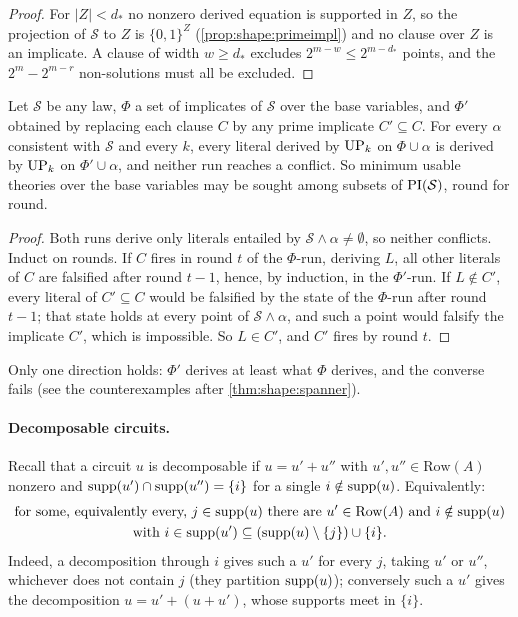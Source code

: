\begin{proof}
For $\lvert Z\rvert<d_*$ no nonzero derived equation is supported in $Z$, so the projection of $\mathcal S$ to $Z$ is $\{0,1\}^Z$ (\cref{prop:shape:primeimpl}) and no clause over $Z$ is an implicate. A clause of width $w\ge d_*$ excludes $2^{m-w}\le2^{m-d_*}$ points, and the $2^m-2^{m-r}$ non-solutions must all be excluded.
\end{proof}

\begin{lemma}[Subsumption]\label{lem:shape:subsumption}
Let $\mathcal S$ be any law, $\Phi$ a set of implicates of $\mathcal S$ over the base variables, and $\Phi'$ obtained by replacing each clause $C$ by any prime implicate $C'\subseteq C$. For every $\alpha$ consistent with $\mathcal S$ and every $k$, every literal derived by $\mathrm{UP}_k$ on $\Phi\cup\alpha$ is derived by $\mathrm{UP}_k$ on $\Phi'\cup\alpha$, and neither run reaches a conflict. So minimum usable theories over the base variables may be sought among subsets of $\mathrm{PI}(\mathcal S)$, round for round.
\end{lemma}

\begin{proof}
Both runs derive only literals entailed by $\mathcal S\wedge\alpha\ne\emptyset$, so neither conflicts. Induct on rounds. If $C$ fires in round $t$ of the $\Phi$-run, deriving $L$, all other literals of $C$ are falsified after round $t-1$, hence, by induction, in the $\Phi'$-run. If $L\notin C'$, every literal of $C'\subseteq C$ would be falsified by the state of the $\Phi$-run after round $t-1$; that state holds at every point of $\mathcal S\wedge\alpha$, and such a point would falsify the implicate $C'$, which is impossible. So $L\in C'$, and $C'$ fires by round $t$.
\end{proof}

Only one direction holds: $\Phi'$ derives at least what $\Phi$ derives, and the converse fails (see the counterexamples after \cref{thm:shape:spanner}).

\paragraph{Decomposable circuits.} Recall that a circuit $u$ is decomposable if $u=u'+u''$ with $u',u''\in\mathrm{Row}(A)$ nonzero and $\operatorname{supp}(u')\cap\operatorname{supp}(u'')=\{i\}$ for a single $i\notin\operatorname{supp}(u)$. Equivalently:
\begin{equation}\label{eq:shape:decomp}
\begin{gathered}
\text{for some, equivalently every, }j\in\operatorname{supp}(u)\text{ there are }u'\in\mathrm{Row}(A)\text{ and }i\notin\operatorname{supp}(u)\\
\text{with }i\in\operatorname{supp}(u')\subseteq(\operatorname{supp}(u)\setminus\{j\})\cup\{i\}.
\end{gathered}
\end{equation}
Indeed, a decomposition through $i$ gives such a $u'$ for every $j$, taking $u'$ or $u''$, whichever does not contain $j$ (they partition $\operatorname{supp}(u)$); conversely such a $u'$ gives the decomposition $u=u'+(u+u')$, whose supports meet in $\{i\}$.

